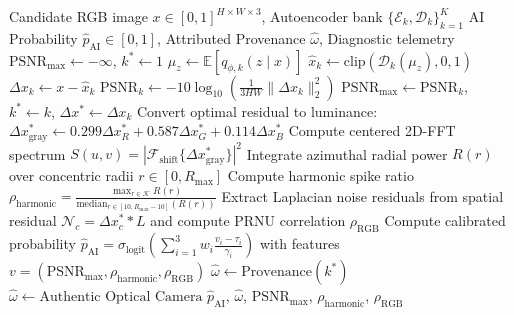 \documentclass[11pt]{article}
\theoremstyle{definition}
\begin{document}
\begin{algorithm}[t]
\caption{Latent Resonance Zero-Shot Forensic Evaluation Pipeline}
\label{alg:latent_resonance}
\begin{algorithmic}[1]
\REQUIRE Candidate RGB image $x \in [0, 1]^{H \times W \times 3}$, Autoencoder bank $\{\mathcal{E}_k, \mathcal{D}_k\}_{k=1}^K$
\ENSURE AI Probability $\hat{p}_{\text{AI}} \in [0, 1]$, Attributed Provenance $\hat{\omega}$, Diagnostic telemetry
\STATE $\text{PSNR}_{\max} \leftarrow -\infty$, $k^* \leftarrow 1$
    \STATE $\mu_z \leftarrow \mathbb{E}[q_{\phi, k}(z \mid x)]$ 
    \STATE $\hat{x}_k \leftarrow \text{clip}(\mathcal{D}_k(\mu_z), 0, 1)$ 
    \STATE $\Delta x_k \leftarrow x - \hat{x}_k$
    \STATE $\text{PSNR}_k \leftarrow -10 \log_{10}(\frac{1}{3HW}\|\Delta x_k\|_2^2)$
        \STATE $\text{PSNR}_{\max} \leftarrow \text{PSNR}_k$, $k^* \leftarrow k$, $\Delta x^* \leftarrow \Delta x_k$
    \ENDIF
\ENDFOR
\STATE Convert optimal residual to luminance: $\Delta x^*_{\text{gray}} \leftarrow 0.299 \Delta x^*_R + 0.587 \Delta x^*_G + 0.114 \Delta x^*_B$
\STATE Compute centered 2D-FFT spectrum $S(u, v) = |\mathcal{F}_{\text{shift}}\{\Delta x^*_{\text{gray}}\}|^2$
\STATE Integrate azimuthal radial power $R(r)$ over concentric radii $r \in [0, R_{\max}]$
\STATE Compute harmonic spike ratio $\rho_{\text{harmonic}} = \frac{\max_{r \in \mathcal{K}} R(r)}{\text{median}_{r \in [10, R_{\max}-10]}(R(r))}$
\STATE Extract Laplacian noise residuals from spatial residual $\mathcal{N}_c = \Delta x^*_c * L$ and compute PRNU correlation $\rho_{\text{RGB}}$
\STATE Compute calibrated probability $\hat{p}_{\text{AI}} = \sigma_{\text{logit}}\left( \sum_{i=1}^3 w_i \frac{v_i - \tau_i}{\gamma_i} \right)$ with features $v = (\text{PSNR}_{\max}, \rho_{\text{harmonic}}, \rho_{\text{RGB}})$
    \STATE $\hat{\omega} \leftarrow \text{Provenance}(k^*)$ 
\ELSE
    \STATE $\hat{\omega} \leftarrow \text{Authentic Optical Camera}$
\ENDIF
\RETURN $\hat{p}_{\text{AI}}$, $\hat{\omega}$, $\text{PSNR}_{\max}$, $\rho_{\text{harmonic}}$, $\rho_{\text{RGB}}$
\end{algorithmic}
\end{algorithm}
\end{document}
